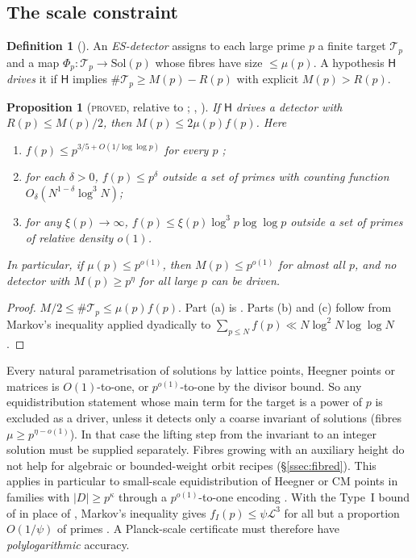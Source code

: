 \documentclass[10pt,reqno]{amsart}
\newtheorem{proposition}[theorem]{Proposition}
\theoremstyle{definition}
\newtheorem{definition}[theorem]{Definition}
\numberwithin{equation}{section}
\newcommand{\cL}{\mathcal L}
\newcommand{\cT}{\mathcal T}
\newcommand{\status}[1]{\textup{\textsc{#1}}}
\begin{document}
\subsection{The scale constraint}
\begin{definition}[{\cite[Def.~2.2]{O127}}]
An \emph{ES-detector} assigns to each large prime $p$ a finite target
$\cT_p$ and a map $\Phi_p:\cT_p\to\mathrm{Sol}(p)$ whose fibres have size
$\le\mu(p)$. A hypothesis $\mathsf H$ \emph{drives} it if $\mathsf H$ implies
$\#\cT_p\ge M(p)-R(p)$ with explicit $M(p)>R(p)$.
\end{definition}

\begin{proposition}[\status{proved}, relative to {\cite[Thm.~1.1, Prop.~1.7]{ET}}; {\cite[Prop.~2.3]{O127}}, {\cite[Prop.~2.4, \S5.5]{RT1}}]\label{prop:scale}
If $\mathsf H$ drives a detector with $R(p)\le M(p)/2$, then
$M(p)\le2\mu(p)f(p)$. Here
\begin{enumerate}
\item[(a)] $f(p)\le p^{3/5+O(1/\log\log p)}$ for every $p$ \cite[Prop.~1.7]{ET};
\item[(b)] for each $\delta>0$, $f(p)\le p^{\delta}$ outside a set of primes
with counting function $O_\delta(N^{1-\delta}\log^3N)$;
\item[(c)] for any $\xi(p)\to\infty$, $f(p)\le\xi(p)\log^3p\log\log p$ outside a
set of primes of relative density $o(1)$.
\end{enumerate}
In particular, if $\mu(p)\le p^{o(1)}$, then $M(p)\le p^{o(1)}$ for almost
all $p$, and no detector with $M(p)\ge p^\eta$ for all large $p$ can be
driven.
\end{proposition}
\begin{proof}
$M/2\le\#\cT_p\le\mu(p)f(p)$. Part (a) is \cite[Prop.~1.7]{ET}. Parts (b)
and (c) follow from Markov's inequality applied dyadically to
$\sum_{p\le N}f(p)\ll N\log^2N\log\log N$ \cite[Thm.~1.1]{ET}.
\end{proof}
Every natural parametrisation of solutions by lattice points, Heegner
points or matrices is $O(1)$-to-one, or $p^{o(1)}$-to-one by the divisor
bound. So any equidistribution statement whose main term for the target is
a power of $p$ is excluded as a driver, unless it detects only a coarse
invariant of solutions (fibres $\mu\ge p^{\eta-o(1)}$). In that case the
lifting step from the invariant to an integer solution must be supplied
separately. Fibres growing with an auxiliary height do not help for
algebraic or bounded-weight orbit recipes (\S\ref{ssec:fibred}). This applies in particular to small-scale equidistribution of
Heegner or CM points in families with $|D|\ge p^\kappa$ through a
$p^{o(1)}$-to-one encoding \cite[Cor.~4.1]{O127}. With the Type~I bound of
\cite{TH} in place of \cite[Thm.~1.1]{ET}, Markov's inequality gives
$f_I(p)\le\psi\cL^3$ for all but a proportion $O(1/\psi)$ of primes
\cite[Thm.~5.1]{O123}. A Planck-scale certificate must therefore have
\emph{polylogarithmic} accuracy.
\end{document}
